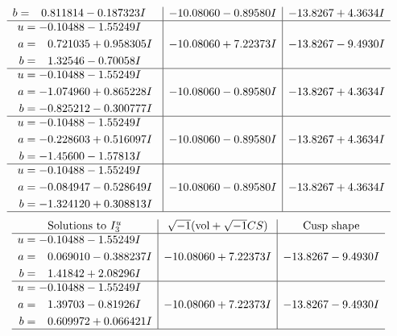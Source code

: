 \documentclass[1p]{elsarticle_modified}
\theoremstyle{definition}
\newcommand{\I}{\sqrt{-1}}
\begin{document}
$$\begin{array}{c|c|c}
\begin{aligned}
b &= \phantom{-}0.811814 - 0.187323 I\end{aligned}
 & -10.08060 - 0.89580 I & -13.8267 + 4.3634 I \\ \hline\begin{aligned}
u &= -0.10488 - 1.55249 I \\
a &= \phantom{-}0.721035 + 0.958305 I \\
b &= \phantom{-}1.32546 - 0.70058 I\end{aligned}
 & -10.08060 + 7.22373 I & -13.8267 - 9.4930 I \\ \hline\begin{aligned}
u &= -0.10488 - 1.55249 I \\
a &= -1.074960 + 0.865228 I \\
b &= -0.825212 - 0.300777 I\end{aligned}
 & -10.08060 - 0.89580 I & -13.8267 + 4.3634 I \\ \hline\begin{aligned}
u &= -0.10488 - 1.55249 I \\
a &= -0.228603 + 0.516097 I \\
b &= -1.45600 - 1.57813 I\end{aligned}
 & -10.08060 - 0.89580 I & -13.8267 + 4.3634 I \\ \hline\begin{aligned}
u &= -0.10488 - 1.55249 I \\
a &= -0.084947 - 0.528649 I \\
b &= -1.324120 + 0.308813 I\end{aligned}
 & -10.08060 - 0.89580 I & -13.8267 + 4.3634 I\\
 \hline 
 \end{array}$$\newpage$$\begin{array}{c|c|c}  
\text{Solutions to }I^u_{3}& \I (\text{vol} + \sqrt{-1}CS) & \text{Cusp shape}\\
 \hline 
\begin{aligned}
u &= -0.10488 - 1.55249 I \\
a &= \phantom{-}0.069010 - 0.388237 I \\
b &= \phantom{-}1.41842 + 2.08296 I\end{aligned}
 & -10.08060 + 7.22373 I & -13.8267 - 9.4930 I \\ \hline\begin{aligned}
u &= -0.10488 - 1.55249 I \\
a &= \phantom{-}1.39703 - 0.81926 I \\
b &= \phantom{-}0.609972 + 0.066421 I\end{aligned}
 & -10.08060 + 7.22373 I & -13.8267 - 9.4930 I\\
 \hline 
 \end{array}$$\newpage\newpage\renewcommand{\arraystretch}{1}
\end{document}
